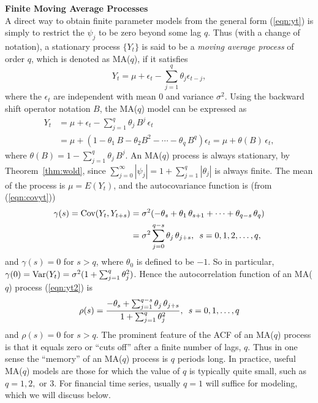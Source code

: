 \noindent \textbf{Finite Moving Average Processes} \\


A direct way to obtain finite parameter models from the general form (\ref{eqn:yt}) is simply to restrict the $\psi_j$ to be zero beyond some lag $q$. Thus (with a change of notation), a stationary process $\{Y_t\}$ is said to be a \textit{moving average process} of order $q$, which is denoted as MA($q$), if it satisfies
	\begin{equation}\label{eqn:yt2}
	Y_t = \mu + \epsilon_t - \sum_{j=1}^{q} \theta_j \epsilon_{t-j},
	\end{equation}
where the $\epsilon_t$ are independent with mean 0 and variance $\sigma^2$. Using the backward shift operator notation $B$, the MA($q$) model can be expressed as
	\begin{equation*}
	\begin{split}
         Y_t & = \mu + \epsilon_t - \sum_{j=1}^q \theta_j \, B^j \, \epsilon_t \\
                & = \mu + (1 - \theta_1 \, B - \theta_2 B^2  - \cdots - \theta_q \, B^q) \epsilon_t= \mu + \theta(B) \, \epsilon_t,	
	\end{split}
	\end{equation*}
where $\theta(B) = 1 - \sum_{j=1}^q \theta_j \, B^j$.  An MA($q$)  process is always stationary, by Theorem~\ref{thm:wold}, since $\sum_{j=0}^{\infty} |\psi_j|= 1 + \sum_{j=1}^q |\theta_j|$ is always finite. The mean of the process is $\mu = E(Y_t)$, and the autocovariance function is (from (\ref{eqn:covyt}))
	\begin{equation*}
	\begin{split}
            \gamma(s) = \text{Cov}(Y_t, Y_{t+s})&= \sigma^2 (-\theta_s + \theta_1 \, \theta_{s+1} + \cdots + \theta_{q-s} \, \theta_q ) \\
                &= \sigma^2 \sum_{j=0}^{q-s} \theta_j \, \theta_{j+s}, \enskip s = 0, 1, 2, \ldots, q,	
	\end{split}
	\end{equation*}
and $\gamma(s)=0$ for $s>q$, where $\theta_0$ is defined to be $-1$. So in particular, $\gamma(0)= \operatorname{Var}(Y_t) = \sigma^2 (1 + \sum_{j=1}^q \theta_j^2)$. Hence the autocorrelation function of an MA($q$) process (\ref{eqn:yt2}) is
       \begin{equation}\label{eqn:rhos}
	\rho(s) = \dfrac{-\theta_s + \sum_{j=1}^{q-s} \theta_j \, \theta_{j+s}}{1 + \sum_{j=1}^q \theta_j^2}, \enskip s = 0,1,\ldots, q
       \end{equation}
and $\rho(s)=0$ for $s>q$. The prominent feature of the ACF of an MA($q$) process is that it equals zero or ``cuts off'' after a finite number of lags, $q$. Thus in one sense the ``memory'' of an MA($q$) process is $q$ periods long. In practice, useful MA($q$) models are those for which the value of $q$ is typically quite small, such as $q=1,2,$ or $3$.  For financial time series, usually $q=1$ will suffice for modeling, which we will discuss below. 


